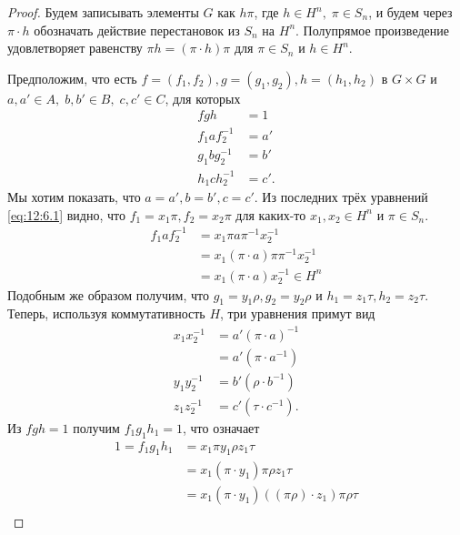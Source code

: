 \begin{proof}
  Будем записывать элементы $G$ как $h \pi$, где $h \in H^n, \; \pi \in S_n$, и будем через $\pi \cdot h$ обозначать действие перестановок из $S_n$ на $H^n$. Полупрямое произведение удовлетворяет равенству $\pi h = (\pi \cdot h) \pi$ для $\pi \in S_n$ и $h \in H^n$.
  
  Предположим, что есть $f = (f_1, f_2), g = (g_1, g_2), h = (h_1, h_2)$ в $G \times G$ и $a, a' \in A, \; b,b' \in B, \; c,c' \in C$, для которых
  \begin{equation}\label{eq:12:6.1}
	  \begin{aligned}
	  fgh & = 1\\
	  f_1 a f_2^{-1} & = a'\\
	  g_1 b g_2^{-1} & = b'\\
	  h_1 c h_2^{-1} & = c'.
	  \end{aligned}
  \end{equation}
  Мы хотим показать, что $a = a', b = b', c = c'$. Из последних трёх уравнений \eqref{eq:12:6.1} видно, что $f_1 = x_1 \pi, f_2 = x_2 \pi$ для каких-то $x_1, x_2 \in H^n$ и $\pi \in S_n$. 
  \begin{align*}
    f_1 a f_2^{-1} & = x_1 \pi a \pi^{-1} x_2^{-1} \\
    & = x_1 (\pi \cdot a) \pi \pi^{-1} x_2^{-1} \\
    & = x_1 (\pi \cdot a) x_2^{-1} \in H^n
  \end{align*}
  Подобным же образом получим, что $g_1 = y_1 \rho, g_2 = y_2 \rho$ и $h_1 = z_1 \tau, h_2 = z_2 \tau$. Теперь, используя коммутативность $H$, три уравнения примут вид
  \begin{equation}\label{eq:12:6.2}
	  \begin{aligned}
		x_1 x_2^{-1} & = a' (\pi \cdot a)^{-1}	 \\
		& = a' (\pi \cdot a^{-1})\\
		y_1 y_2^{-1} & = b' (\rho \cdot b^{-1}) \\
		z_1 z_2^{-1} & = c' (\tau \cdot c^{-1}).
	  \end{aligned}
  \end{equation}
  Из $fgh=1$ получим $f_1 g_1 h_1 = 1$, что означает
  \begin{align*}
       1 = f_1 g_1 h_1 & = x_1 \pi y_1 \rho z_1 \tau\\
       & = x_1 (\pi \cdot y_1) \pi \rho z_1 \tau\\
       & = x_1 (\pi \cdot y_1) ((\pi \rho) \cdot z_1) \pi \rho \tau\\

\end{align*}
\end{proof}
